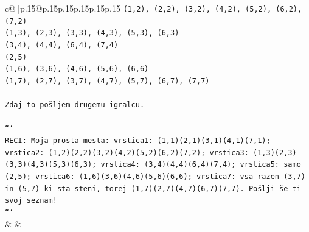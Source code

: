 \documentclass{article}
\begin{document}
{\begin{supertabular}{c@{$\;$}|p{.15\linewidth}@{}p{.15\linewidth}p{.15\linewidth}p{.15\linewidth}p{.15\linewidth}p{.15\linewidth}}
{{{\texttt{(1,2), (2,2), (3,2), (4,2), (5,2), (6,2), (7,2)} \\
\texttt{(1,3), (2,3), (3,3), (4,3), (5,3), (6,3)} \\
\texttt{(3,4), (4,4), (6,4), (7,4)} \\
\texttt{(2,5)} \\
\texttt{(1,6), (3,6), (4,6), (5,6), (6,6)} \\
\texttt{(1,7), (2,7), (3,7), (4,7), (5,7), (6,7), (7,7)} \\
\\ 
\texttt{Zdaj to pošljem drugemu igralcu.} \\
\\ 
\texttt{```} \\
\texttt{RECI: Moja prosta mesta: vrstica1: (1,1)(2,1)(3,1)(4,1)(7,1); vrstica2: (1,2)(2,2)(3,2)(4,2)(5,2)(6,2)(7,2); vrstica3: (1,3)(2,3)(3,3)(4,3)(5,3)(6,3); vrstica4: (3,4)(4,4)(6,4)(7,4); vrstica5: samo (2,5); vrstica6: (1,6)(3,6)(4,6)(5,6)(6,6); vrstica7: vsa razen (3,7) in (5,7) ki sta steni, torej (1,7)(2,7)(4,7)(6,7)(7,7). Pošlji še ti svoj seznam!} \\
\texttt{```} \\
            }
        }
    }
    & & \\ \\


\end{supertabular}}
\end{document}
